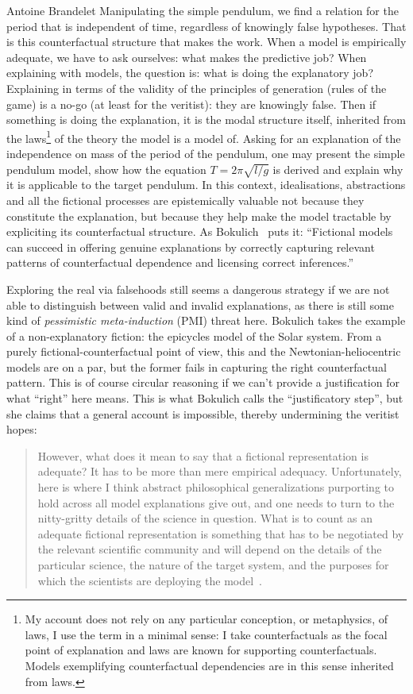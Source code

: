 \begin{artengenv}{Antoine Brandelet}
Manipulating the simple pendulum, we find a relation for the period that is independent of time, regardless of knowingly false hypotheses. That is this counterfactual structure that makes the work. When a model is empirically adequate, we have to ask ourselves: what makes the predictive job? When explaining with models, the question is: what is doing the explanatory job? Explaining in terms of the validity of the principles of generation (rules of the game) is a no-go (at least for the veritist): they are knowingly false. Then if something is doing the explanation, it is the modal structure itself, inherited from the laws\footnote{My account does not rely on any particular conception, or metaphysics, of laws, I use the term in a minimal sense: I take counterfactuals as the focal point of explanation and laws are known for supporting counterfactuals. Models exemplifying counterfactual dependencies are in this sense inherited from laws.} of the theory the model is a model of. Asking for an explanation of the independence on mass of the period of the pendulum, one may present the simple pendulum model, show how the equation $T = 2\pi \sqrt{l/g}$ is derived and explain why it is applicable to the target pendulum. In this context, idealisations, abstractions and all the fictional processes are epistemically valuable not because they constitute the explanation, but because they help make the model tractable by expliciting its counterfactual structure. As Bokulich~\parencite*[p.1]{Bokulich2016} puts it: ``Fictional models can succeed in offering genuine explanations by correctly capturing relevant patterns of counterfactual dependence and licensing correct inferences.''

Exploring the real via falsehoods still seems a dangerous strategy if we are not able to distinguish between valid and invalid explanations, as there is still some kind of \textit{pessimistic meta-induction} (PMI) threat here. Bokulich takes the example of a non-explanatory fiction: the epicycles model of the Solar system. From a purely fictional-counterfactual point of view, this and the Newtonian-heliocentric models are on a par, but the former fails in capturing the right counterfactual pattern. This is of course circular reasoning if we can't provide a justification for what ``right'' here means. This is what Bokulich calls the ``justificatory step'', but she claims that a general account is impossible, thereby undermining the veritist hopes: 

\begin{quote}
However, what does it mean to say that a fictional representation is adequate? It has to be more than mere empirical adequacy. Unfortunately, here is where I think abstract philosophical generalizations purporting to hold across all model explanations give out, and one needs to turn to the nitty-gritty details of the science in question. What is to count as an adequate fictional representation is something that has to be negotiated by the relevant scientific community and will depend on the details of the particular science, the nature of the target system, and the purposes for which the scientists are deploying the model~\parencite[p.734]{Bokulich2012}.
\end{quote}


\end{artengenv}

